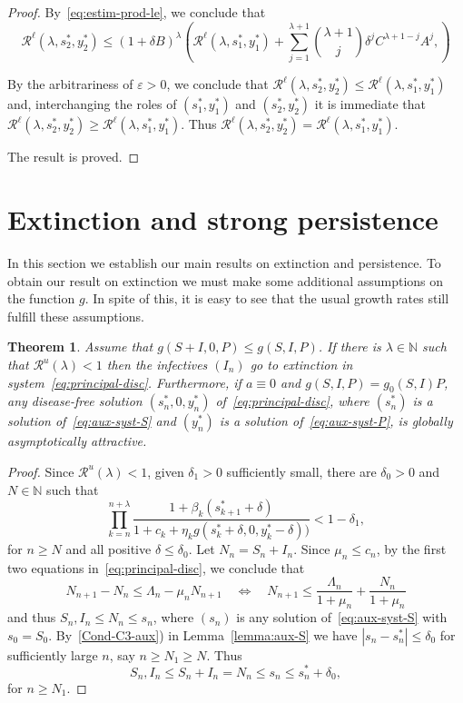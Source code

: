 \documentclass[reqno]{amsart}
\newtheorem{theorem}{Theorem}
\renewcommand{\le}{\leqslant}
\renewcommand{\ge}{\geqslant}
\newcommand{\eps}{\varepsilon}
\newcommand{\lbd}{\lambda}
\newcommand{\cR}{\mathcal R}
\newcommand{\N}{\ensuremath{\mathds N}}
\begin{document}
{{\begin{proof}
By~\eqref{eq:estim-prod-le}, we conclude that
$$\cR^\ell(\lambda,s^*_2,y^*_2) \le (1+\delta B)^\lbd \left(\cR^\ell(\lambda,s^*_1,y^*_1)
+  \sum_{j=1}^{\lambda+1} \binom{\lambda+1}{j}\delta^j  C^{\lambda+1-j} A^j,\right)$$

By the arbitrariness of $\eps>0$, we conclude that $\cR^\ell(\lambda,s^*_2,y^*_2) \le \cR^\ell(\lambda,s^*_1,y^*_1)$ and, interchanging the roles of $(s^*_1,y^*_1)$ and $(s^*_2,y^*_2)$ it is immediate that
$\cR^\ell(\lambda,s^*_2,y^*_2) \ge \cR^\ell(\lambda,s^*_1,y^*_1)$. Thus $\cR^\ell(\lambda,s^*_2,y^*_2) = \cR^\ell(\lambda,s^*_1,y^*_1)$.

The result is proved.
\end{proof}

{\section{Extinction and strong persistence}\label{sec2}}

In this section we establish our main results on extinction and persistence. To obtain our result on extinction we must make some additional assumptions on the function $g$. In spite of this, it is easy to see that the usual growth rates still fulfill these assumptions.

\begin{theorem}\label{teo:Main-ext}
Assume that $g(S+I,0,P)\le g(S,I,P)$. If there is $\lambda \in \N$ such that $\cR^u(\lambda)<1$ then the infectives $(I_n)$ go to extinction in system~\eqref{eq:principal-disc}. Furthermore, if $a \equiv 0$ and $g(S,I,P)=g_0(S,I)P$, any disease-free solution $(s^*_n,0,y^*_n)$ of~\eqref{eq:principal-disc}, where $(s^*_n)$ is a solution of~\eqref{eq:aux-syst-S} and $(y^*_n)$ is a solution of~\eqref{eq:aux-syst-P}, is globally asymptotically attractive.
\end{theorem}

\begin{proof}
Since $\cR^u(\lbd)<1$, given $\delta_1>0$ sufficiently small, there are $\delta_0>0$ and $N \in \N$ such that
\begin{equation}\label{eq:condi-ext}
\prod_{k=n}^{n+\lambda} \dfrac{1+\beta_k(s^*_{k+1}+\delta)}{1+c_k+\eta_kg(s^*_k+\delta,0,y^*_k-\delta))}<1-\delta_1,
\end{equation}
for $n \ge N$ and all positive $\delta\le \delta_0$. Let $N_n=S_n+I_n$. Since $\mu_n \le c_n$, by the first two equations in~\eqref{eq:principal-disc}, we conclude that
  $$N_{n+1}-N_n \le \Lambda_n-\mu_n N_{n+1} \quad \Leftrightarrow \quad N_{n+1} \le \frac{\Lambda_n}{1+\mu_n}+\frac{N_n}{1+\mu_n} $$
and thus $S_n, I_n \le N_n \le s_n$, where $(s_n)$ is any solution of~\eqref{eq:aux-syst-S} with $s_0=S_0$. By~\ref{Cond-C3-aux}) in Lemma~\ref{lemma:aux-S} we have $|s_n-s_n^*|\le \delta_0$ for sufficiently large $n$, say $n\ge N_1 \ge N$. Thus
$$S_n, I_n \le S_n+I_n=N_n \le s_n \le s_n^*+\delta_0,$$
for $n\ge N_1$.


\end{proof}}}
\end{document}

